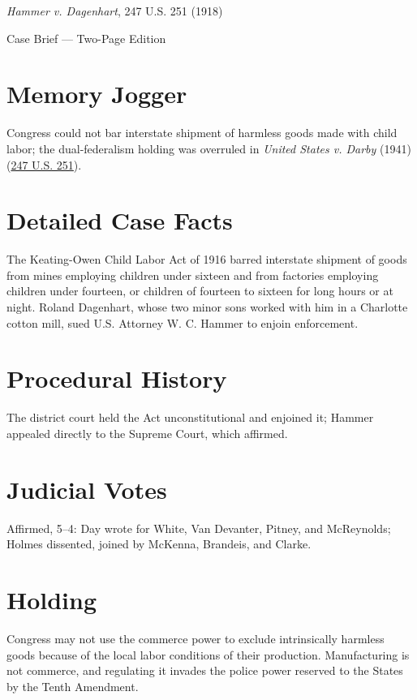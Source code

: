 \documentclass[12pt]{article}
\begin{document}
\begin{center}
{\LARGE \textit{Hammer v. Dagenhart}, 247 U.S. 251 (1918)\par}
\vspace{0.5em}
{\large Case Brief --- Two-Page Edition\par}
\end{center}

\section{Memory Jogger}
Congress could not bar interstate shipment of harmless goods made with child labor; the dual-federalism holding was overruled in \textit{United States v. Darby} (1941) (\href{https://supreme.justia.com/cases/federal/us/247/251/}{247 U.S. 251}).

\section{Detailed Case Facts}
The Keating-Owen Child Labor Act of 1916 barred interstate shipment of goods from mines employing children under sixteen and from factories employing children under fourteen, or children of fourteen to sixteen for long hours or at night. Roland Dagenhart, whose two minor sons worked with him in a Charlotte cotton mill, sued U.S. Attorney W. C. Hammer to enjoin enforcement.

\section{Procedural History}
The district court held the Act unconstitutional and enjoined it; Hammer appealed directly to the Supreme Court, which affirmed.

\section{Judicial Votes}
Affirmed, 5--4: Day wrote for White, Van Devanter, Pitney, and McReynolds; Holmes dissented, joined by McKenna, Brandeis, and Clarke.

\section{Holding}
Congress may not use the commerce power to exclude intrinsically harmless goods because of the local labor conditions of their production. Manufacturing is not commerce, and regulating it invades the police power reserved to the States by the Tenth Amendment.
\end{document}
